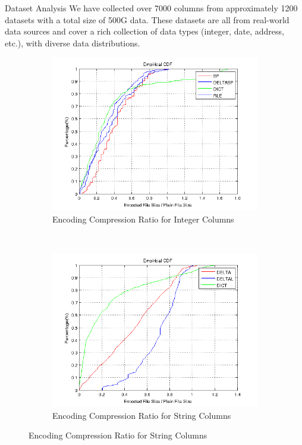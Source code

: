 \documentclass{beamer}
\newlength{\onecolwid}
\begin{document}
\begin{frame}[t]
\begin{columns}[t]
\begin{column}{\onecolwid}
\begin{block}{Dataset Analysis}
We have collected over 7000 columns from approximately 1200 datasets
with a total size of 500G data. These datasets are all from real-world data
sources and cover a rich collection of data types (integer, date, address,
etc.), with diverse data distributions.
\begin{figure}
\begin{subfigure}{0.45\textwidth}
\includegraphics[scale=1]{img/integer_cdf}
\caption{Encoding Compression Ratio for Integer Columns}
\end{subfigure}~
\begin{subfigure}{0.45\textwidth}
\includegraphics[scale=1]{img/string_cdf}  
\caption{Encoding Compression Ratio for String Columns}
\end{subfigure}
\end{figure}


\end{block}
\end{column}
\end{columns}
\end{frame}
\end{document}
